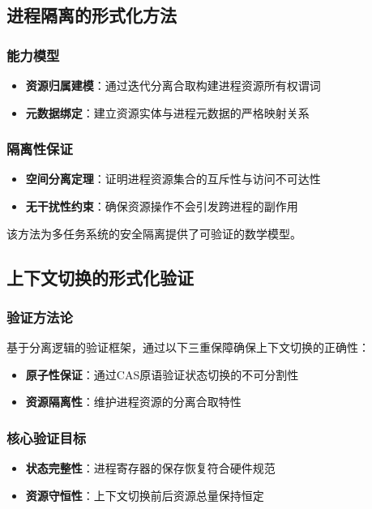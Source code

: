 \subsection{进程隔离的形式化方法}
\label{subiso:proc-isolation}

\subsubsection{能力模型}
\begin{itemize}
    \item \textbf{资源归属建模}：通过迭代分离合取构建进程资源所有权谓词
    \item \textbf{元数据绑定}：建立资源实体与进程元数据的严格映射关系
\end{itemize}

\subsubsection{隔离性保证}
\begin{itemize}
    \item \textbf{空间分离定理}：证明进程资源集合的互斥性与访问不可达性
    \item \textbf{无干扰性约束}：确保资源操作不会引发跨进程的副作用
\end{itemize}

该方法为多任务系统的安全隔离提供了可验证的数学模型。

\subsection{上下文切换的形式化验证}
\label{subsec:context-verification}

\subsubsection{验证方法论}
基于分离逻辑的验证框架，通过以下三重保障确保上下文切换的正确性：
\begin{itemize}
    \item \textbf{原子性保证}：通过CAS原语验证状态切换的不可分割性
    \item \textbf{资源隔离性}：维护进程资源的分离合取特性
\end{itemize}

\subsubsection{核心验证目标}
\begin{itemize}
    \item \textbf{状态完整性}：进程寄存器的保存恢复符合硬件规范
    \item \textbf{资源守恒性}：上下文切换前后资源总量保持恒定
\end{itemize}

